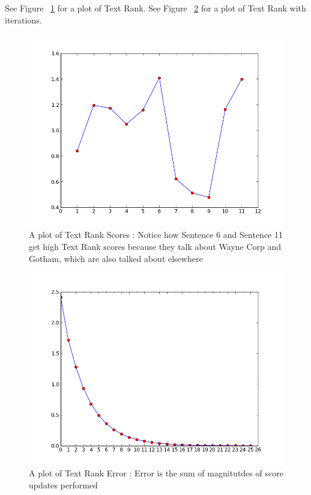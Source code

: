 \documentclass[paper=a4, fontsize=11pt]{scrartcl} %
\numberwithin{equation}{section} %
\numberwithin{figure}{section} %
\numberwithin{table}{section} %
\begin{document}
See Figure ~\ref{fig:tr} for a plot of Text Rank. See Figure ~\ref{fig:error} for a plot of Text Rank with iterations. 

\begin{figure}[h!]
  \centering
    \includegraphics[width=.8\textwidth]{images/tr}
    \caption{A plot of Text Rank Scores : Notice how Sentence 6 and Sentence 11 get high Text Rank scores because they talk about Wayne Corp and Gotham, which are also talked about elsewhere}
    \label{fig:tr}
\end{figure}


\begin{figure}[h!]
  \centering
    \includegraphics[width=.8\textwidth]{images/error}
    \caption{A plot of Text Rank Error : Error is the sum of magnitutdes of score updates performed}
    \label{fig:error}
\end{figure}

\pagebreak
{}

\end{document}
